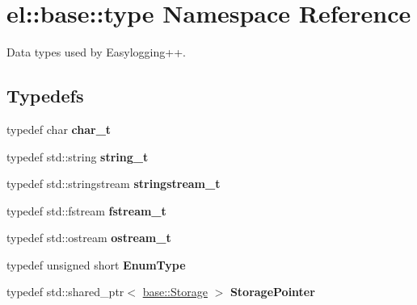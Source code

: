 \hypertarget{namespaceel_1_1base_1_1type}{}\section{el\+:\+:base\+:\+:type Namespace Reference}
\label{namespaceel_1_1base_1_1type}


Data types used by Easylogging++.  


\subsection*{Typedefs}
\begin{DoxyCompactItemize}
\item 
typedef char {\bfseries char\+\_\+t}\hypertarget{namespaceel_1_1base_1_1type_ae9fe1ba101c2444b8cad9a2484b54907}{}\label{namespaceel_1_1base_1_1type_ae9fe1ba101c2444b8cad9a2484b54907}

\item 
typedef std\+::string {\bfseries string\+\_\+t}\hypertarget{namespaceel_1_1base_1_1type_a67e406cd213c231f1d135b5a4eda64b5}{}\label{namespaceel_1_1base_1_1type_a67e406cd213c231f1d135b5a4eda64b5}

\item 
typedef std\+::stringstream {\bfseries stringstream\+\_\+t}\hypertarget{namespaceel_1_1base_1_1type_a3492908c4b80f97b6c4b346d394f1302}{}\label{namespaceel_1_1base_1_1type_a3492908c4b80f97b6c4b346d394f1302}

\item 
typedef std\+::fstream {\bfseries fstream\+\_\+t}\hypertarget{namespaceel_1_1base_1_1type_a620c830ead75d26b45c060c211ee2685}{}\label{namespaceel_1_1base_1_1type_a620c830ead75d26b45c060c211ee2685}

\item 
typedef std\+::ostream {\bfseries ostream\+\_\+t}\hypertarget{namespaceel_1_1base_1_1type_a74ea109bf34d1c44926837fb0830f445}{}\label{namespaceel_1_1base_1_1type_a74ea109bf34d1c44926837fb0830f445}

\item 
typedef unsigned short {\bfseries Enum\+Type}\hypertarget{namespaceel_1_1base_1_1type_afb892a99b7545bf6e45c1e1d84af2ec9}{}\label{namespaceel_1_1base_1_1type_afb892a99b7545bf6e45c1e1d84af2ec9}

\item 
typedef std\+::shared\+\_\+ptr$<$ \hyperlink{classel_1_1base_1_1Storage}{base\+::\+Storage} $>$ {\bfseries Storage\+Pointer}\hypertarget{namespaceel_1_1base_1_1type_a3c34822c3825018aca1526f2289b7976}{}\label{namespaceel_1_1base_1_1type_a3c34822c3825018aca1526f2289b7976}


\end{DoxyCompactItemize}
